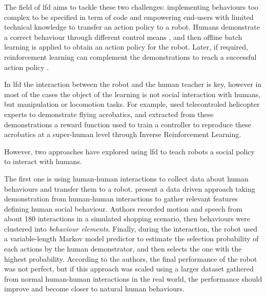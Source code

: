 	    
	The field of \gls{lfd} aims to tackle these two challenges: implementing behaviours too complex to be specified in term of code and empowering end-users with limited technical knowledge to transfer an action policy to a robot. Humans demonstrate a correct behaviour through different control means \citep{argall2009survey}, and then offline batch learning is applied to obtain an action policy for the robot. Later, if required, reinforcement learning can complement the demonstrations to reach a successful action policy \citep{billard2008robot}.
	
	In \gls{lfd} the interaction between the robot and the human teacher is key, however in most of the cases the object of the learning is not social interaction with humans, but manipulation or locomotion tasks. For example, \cite{abbeel2004apprenticeship} used telecontroled helicopter experts to demonstrate flying acrobatics, and extracted from these demonstrations a reward function used to train a controller to reproduce these acrobatics at a super-human level through Inverse Reinforcement Learning. %
	
	However, two approaches have explored using \gls{lfd} to teach robots a social policy to interact with humans.
	
	The first one is using human-human interactions to collect data about human behaviours and transfer them to a robot. \citet{liu2014train} present a data driven approach taking demonstration from human-human interactions to gather relevant features defining human social behaviour. Authors recorded motion and speech from about 180 interactions in a simulated shopping scenario, then behaviours were clustered into \emph{behaviour elements}. Finally, during the interaction, the robot used a variable-length Markov model predictor to estimate the selection probability of each actions by the human demonstrator, and then selects the one with the highest probability. According to the authors, the final performance of the robot was not perfect, but if this approach was scaled using a larger dataset gathered from normal human-human interactions in the real world, the performance should improve and become closer to natural human behaviours.
    
